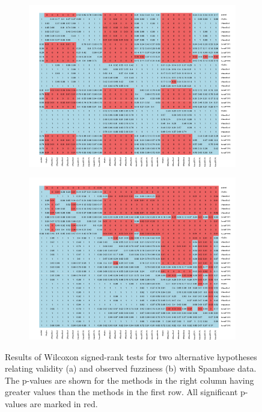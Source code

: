 \documentclass[main]{subfiles}
\begin{document}
\begin{figure}[h]
\centering
\begin{subfigure}{.5\textwidth}
  \centering
  \includegraphics[width=\linewidth]{images/heatmapSB}
\end{subfigure}%
\begin{subfigure}{.5\textwidth}
  \centering
  \includegraphics[width=\linewidth]{images/heatmapSB_eff}
\end{subfigure}%
\caption{Results of Wilcoxon signed-rank tests for two alternative hypotheses relating validity (a) and observed fuzziness (b) with Spambase data. The p-values are shown for the methods in the right column having greater values than the methods in the first row. All significant p-values are marked in red.}
\label{fig:testSpam}
\end{figure}
\end{document}
